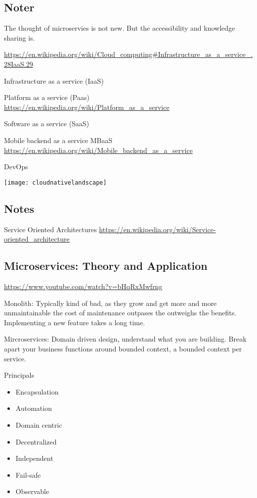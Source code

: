 \subsection*{Noter}
The thought of microservies is not new. But the accessibility and knowledge sharing is.

\url{https://en.wikipedia.org/wiki/Cloud_computing#Infrastructure_as_a_service_.28IaaS.29}

Infrastructure as a service  (IaaS)

Platform as a service (Paas) \url{https://en.wikipedia.org/wiki/Platform_as_a_service}

Software as a service (SaaS)

Mobile backend as a service MBaaS \url{https://en.wikipedia.org/wiki/Mobile_backend_as_a_service}

DevOps

\texttt{[image: cloudnativelandscape]}

\subsection*{Notes}
Service Oriented Architectures \url{https://en.wikipedia.org/wiki/Service-oriented_architecture}


\subsection{Microservices: Theory and Application}
\url{https://www.youtube.com/watch?v=bHqRxMwfrng}

Monolith:
Typically kind of bad, as they grow and get more and more unmaintainable the cost of maintenance outpases the outweighs the benefits. Implementing a new feature takes a long time.

Mircroservices:
Domain driven design, understand what you are building. Break apart your business functions around bounded context, a bounded context per service.

Principals

\begin{itemize}
\item Encapsulation
\item Automation
\item Domain centric
\item Decentralized
\item Independent
\item Fail-safe
\item Observable
\end{itemize}


